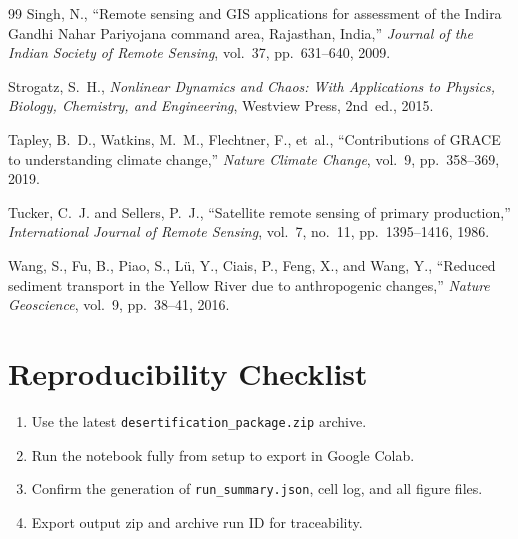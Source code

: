 \documentclass[12pt, a4paper]{article}
\begin{document}
\begin{thebibliography}{99}
Singh, N.,
``Remote sensing and GIS applications for assessment of the Indira Gandhi Nahar Pariyojana command area, Rajasthan, India,''
\emph{Journal of the Indian Society of Remote Sensing}, vol.~37, pp.~631--640, 2009.

Strogatz, S.~H.,
\emph{Nonlinear Dynamics and Chaos: With Applications to Physics, Biology, Chemistry, and Engineering},
Westview Press, 2nd~ed., 2015.

Tapley, B.~D., Watkins, M.~M., Flechtner, F., et~al.,
``Contributions of GRACE to understanding climate change,''
\emph{Nature Climate Change}, vol.~9, pp.~358--369, 2019.

Tucker, C.~J. and Sellers, P.~J.,
``Satellite remote sensing of primary production,''
\emph{International Journal of Remote Sensing}, vol.~7, no.~11,
pp.~1395--1416, 1986.

Wang, S., Fu, B., Piao, S., Lü, Y., Ciais, P., Feng, X., and Wang, Y.,
``Reduced sediment transport in the Yellow River due to anthropogenic changes,''
\emph{Nature Geoscience}, vol.~9, pp.~38--41, 2016.

\end{thebibliography}

\appendix

\section{Reproducibility Checklist}
\begin{enumerate}[leftmargin=1.6em]
    \item Use the latest \texttt{desertification\_package.zip} archive.
    \item Run the notebook fully from setup to export in Google Colab.
    \item Confirm the generation of \texttt{run\_summary.json}, cell log, and all figure files.
    \item Export output zip and archive run ID for traceability.
\end{enumerate}
\end{document}
